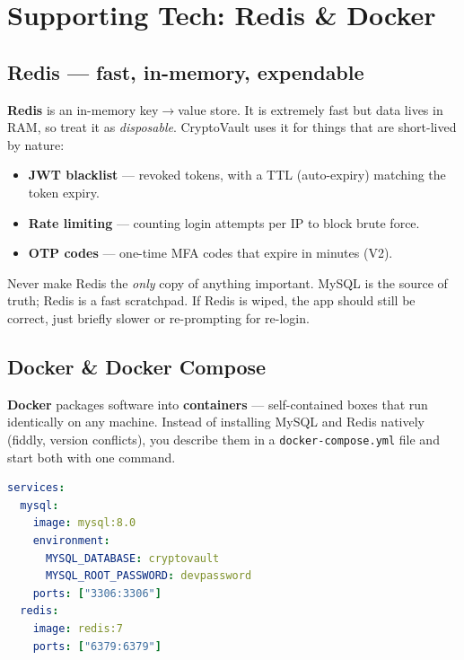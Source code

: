 \documentclass[11pt,a4paper]{article}
\begin{document}
\section{Supporting Tech: Redis \& Docker}

\subsection{Redis — fast, in-memory, expendable}

\textbf{Redis} is an in-memory key$\rightarrow$value store. It is extremely fast but data lives in
RAM, so treat it as \emph{disposable}. CryptoVault uses it for things that are short-lived by nature:
\begin{itemize}[leftmargin=*]
  \item \textbf{JWT blacklist} — revoked tokens, with a TTL (auto-expiry) matching the token expiry.
  \item \textbf{Rate limiting} — counting login attempts per IP to block brute force.
  \item \textbf{OTP codes} — one-time MFA codes that expire in minutes (V2).
\end{itemize}

\begin{pitfall}
Never make Redis the \emph{only} copy of anything important. MySQL is the source of truth; Redis is
a fast scratchpad. If Redis is wiped, the app should still be correct, just briefly slower or
re-prompting for re-login.
\end{pitfall}

\subsection{Docker \& Docker Compose}

\textbf{Docker} packages software into \textbf{containers} — self-contained boxes that run
identically on any machine. Instead of installing MySQL and Redis natively (fiddly, version
conflicts), you describe them in a \texttt{docker-compose.yml} file and start both with one command.

\begin{lstlisting}[language=YAML]
services:
  mysql:
    image: mysql:8.0
    environment:
      MYSQL_DATABASE: cryptovault
      MYSQL_ROOT_PASSWORD: devpassword
    ports: ["3306:3306"]
  redis:
    image: redis:7
    ports: ["6379:6379"]
\end{lstlisting}
\end{document}
